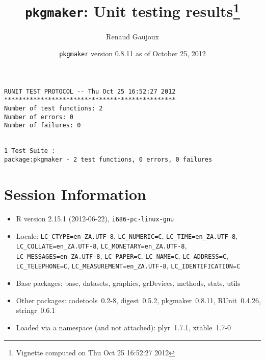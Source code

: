\documentclass[10pt]{article}
\author{Renaud Gaujoux}
\title{\texttt{pkgmaker}: Unit testing results\footnote{Vignette computed  on Thu Oct 25 16:52:27 2012}}
\date{\texttt{pkgmaker} version 0.8.11 as of October 25, 2012}
\begin{document}
\maketitle

\begin{verbatim}
RUNIT TEST PROTOCOL -- Thu Oct 25 16:52:27 2012 
*********************************************** 
Number of test functions: 2 
Number of errors: 0 
Number of failures: 0 

 
1 Test Suite : 
package:pkgmaker - 2 test functions, 0 errors, 0 failures
\end{verbatim}

\section*{Session Information}
\begin{itemize}\raggedright
  \item R version 2.15.1 (2012-06-22), \verb|i686-pc-linux-gnu|
  \item Locale: \verb|LC_CTYPE=en_ZA.UTF-8|, \verb|LC_NUMERIC=C|, \verb|LC_TIME=en_ZA.UTF-8|, \verb|LC_COLLATE=en_ZA.UTF-8|, \verb|LC_MONETARY=en_ZA.UTF-8|, \verb|LC_MESSAGES=en_ZA.UTF-8|, \verb|LC_PAPER=C|, \verb|LC_NAME=C|, \verb|LC_ADDRESS=C|, \verb|LC_TELEPHONE=C|, \verb|LC_MEASUREMENT=en_ZA.UTF-8|, \verb|LC_IDENTIFICATION=C|
  \item Base packages: base, datasets, graphics, grDevices, methods,
    stats, utils
  \item Other packages: codetools~0.2-8, digest~0.5.2, pkgmaker~0.8.11,
    RUnit~0.4.26, stringr~0.6.1
  \item Loaded via a namespace (and not attached): plyr~1.7.1,
    xtable~1.7-0
\end{itemize}
\end{document}
